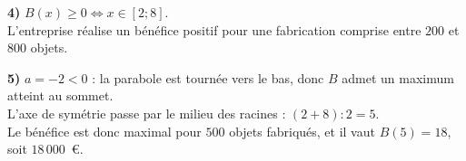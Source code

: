 \documentclass[11pt,a4paper]{book}
\begin{document}
\medskip
\begin{corrBox}
	\textbf{4)} $B(x)\geq0 \iff x\in[2 ; 8]$.\\
	L'entreprise réalise un bénéfice positif pour une fabrication comprise entre $200$ et $800$ objets.
\end{corrBox}

\medskip
\begin{corrBox}
	\textbf{5)} $a=-2<0$ : la parabole est tournée vers le bas, donc $B$ admet un maximum atteint au sommet.\\
	L'axe de symétrie passe par le milieu des racines : $(2+8):2=5$.\\
	Le bénéfice est donc maximal pour $500$ objets fabriqués, et il vaut $B(5)=18$, soit $18\,000$~\euro.
\end{corrBox}
\end{document}
